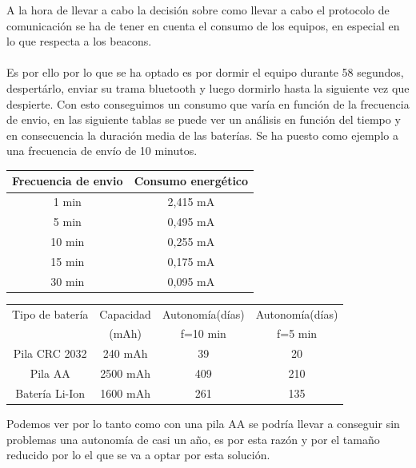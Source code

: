\documentclass[paper=a4, fontsize=11pt,twoside]{scrartcl}	%
\begin{document}
            A la hora de llevar a cabo la decisión sobre como llevar a cabo el protocolo de comunicación se ha de tener en cuenta 
            el consumo de los equipos, en especial en lo que respecta a los beacons.
            \paragraph{}
            Es por ello por lo que se ha optado es por dormir el equipo durante 58 segundos, despertárlo,
            enviar su trama bluetooth y luego dormirlo hasta la siguiente vez que despierte.
            Con esto conseguimos un consumo que varía en función de la frecuencia de envio, en las siguiente tablas
            se puede ver un análisis en función del tiempo y en consecuencia la duración media de las baterías.
            Se ha puesto como ejemplo a una frecuencia de envío de 10 minutos.
            \begin{center}
                \begin{tabular}{||c || c ||} 
                \hline
                Frecuencia de envio  & Consumo energético  \\ [0.5ex] 
                \hline
                1 min &  2,415 mA \\
                5 min &  0,495 mA \\ 
                10 min &  0,255 mA \\ 
                15 min &  0,175 mA \\ 
                30 min &  0,095 mA \\ 
                \hline
                \end{tabular}
            \end{center}
            \begin{center}
                \begin{tabular}{|c | c| c| c |} 
                \hline
                    Tipo de batería & Capacidad  & Autonomía(días) & Autonomía(días)   \\ [0.5ex] 
                    & (mAh) &  f=10 min &  f=5 min   \\ [0.5ex] 
                \hline
                \hline
                    Pila CRC 2032 &  240 mAh  & 39   & 20 \\ 
                    Pila AA       &  2500 mAh & 409  & 210 \\ 
                    Batería Li-Ion&  1600 mAh & 261  & 135 \\ 
                \hline
                \end{tabular}
            \end{center}
            Podemos ver por lo tanto como con una pila AA se podría llevar a conseguir sin problemas una autonomía de casi un 
            año, es por esta razón y por el tamaño reducido por lo el que se va a optar por esta solución.
            
\end{document}
